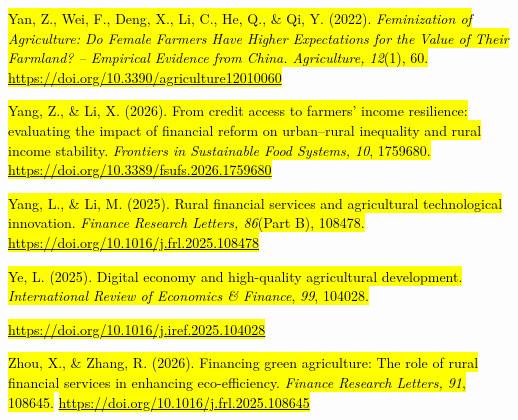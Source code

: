 \documentclass[
]{article}
\begin{document}
\hl{Yan, Z., Wei, F., Deng, X., Li, C., He, Q., \& Qi, Y. (2022).
\emph{Feminization of Agriculture: Do Female Farmers Have Higher
Expectations for the Value of Their Farmland? -- Empirical Evidence from
China. Agriculture, 12}(1), 60.}
\href{https://doi.org/10.3390/agriculture12010060}{\hl{https://doi.org/10.3390/agriculture12010060}}

\hl{Yang, Z., \& Li, X. (2026). From credit access to farmers' income
resilience: evaluating the impact of financial reform on urban--rural
inequality and rural income stability. \emph{Frontiers in Sustainable
Food Systems, 10}, 1759680.}
\href{https://doi.org/10.3389/fsufs.2026.1759680}{\hl{https://doi.org/10.3389/fsufs.2026.1759680}}

\hl{Yang, L., \& Li, M. (2025). Rural financial services and
agricultural technological innovation. \emph{Finance Research Letters,
86}(Part B), 108478.}
\href{https://doi.org/10.1016/j.frl.2025.108478}{\hl{https://doi.org/10.1016/j.frl.2025.108478}}

\hl{Ye, L. (2025). Digital economy and high-quality agricultural
development. \emph{International Review of Economics \& Finance},
\emph{99}, 104028.}

\href{https://doi.org/10.1016/j.iref.2025.104028}{\hl{https://doi.org/10.1016/j.iref.2025.104028}}

\hl{Zhou, X., \& Zhang, R. (2026). Financing green agriculture: The role
of rural financial services in enhancing eco-efficiency. \emph{Finance
Research Letters, 91}, 108645.}
\href{https://doi.org/10.1016/j.frl.2025.108645}{\hl{https://doi.org/10.1016/j.frl.2025.108645}}
\end{document}
